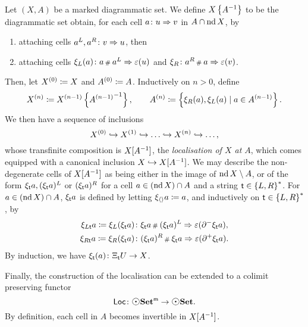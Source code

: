 \begin{dfn}
    Let \( (X, A) \) be a marked diagrammatic set.
    We define \( \preloc{X}{A} \) to be the diagrammatic set obtain, for each cell \( a \colon u \celto v \) in \( A \cap \nd X \), by
    \begin{enumerate}
        \item attaching cells \( a^L, a^R  \colon v \celto u \), then
        \item attaching cells \( \hinv{L}(a) \colon a \cp{} a^L \celto \un(u) \) and \( \hinv{R} \colon a^R \cp{} a \celto \un(v) \).
    \end{enumerate} 
    Then, let \( \order{0}{X} \eqdef X \) and \( \order{0}{A} \eqdef A \).
    Inductively on \( n > 0 \), define
    \begin{equation*}
        \order{n}{X} \eqdef \preloc{\order{n - 1}{X}}{\order{n - 1}{A}}, \quad\quad \order{n}{A} \eqdef \set{\hinv{R}(a), \hinv{L}(a) \mid a \in \order{n - 1}{A}}.
    \end{equation*}
    We then have a sequence of inclusions
    \begin{equation*}
        \order{0}{X} \incl \order{1}{X} \incl \ldots \incl \order{n}{X} \incl \ldots,
    \end{equation*}
    whose transfinite composition is \( \loc{X}{A} \), the \emph{localisation of \( X \) at \( A \)}, which comes equipped with a canonical inclusion \( X \incl \loc{X}{A} \).
    We may describe the non-degenerate cells of \( \loc{X}{A} \) as being either in the image of \( \nd X \setminus A \), or of the form \( \hinv{\s}a, (\hinv{\s}a)^L \) or \( (\hinv{\s}a)^R \) for a cell \( a \in (\nd X) \cap A \) and a string \( \s \in \set{L, R}^* \). 
    For \( a \in (\nd X) \cap A \), \( \hinv{\s}a \) is defined by letting \( \hinv{\langle\rangle} a \eqdef a \), and inductively on \( \s \in \set{L, R}^* \), by
    \begin{align*}
        \hinv{L\s}a \eqdef \hinv{L}(\hinv{\s}a) &\colon \hinv{\s}a \cp{} (\hinv{\s}a)^L \celto \un(\bd{}{-}\hinv{\s}a),\\
        \hinv{R\s}a \eqdef \hinv{R}(\hinv{\s}a) &\colon (\hinv{\s}a)^R \cp{} \hinv{\s}a \celto \un(\bd{}{+}\hinv{\s}a).
    \end{align*}
    By induction, we have \( \hinv{\s}(a) \colon \hcyl{\s} U \to X \).
    
    Finally, the construction of the localisation can be extended to a colimit preserving functor
    \begin{equation*}
        \Loc \colon \mdgmSet \to \dgmSet.
    \end{equation*}
    By definition, each cell in \( A \) becomes invertible in \( \loc{X}{A} \).
\end{dfn}

